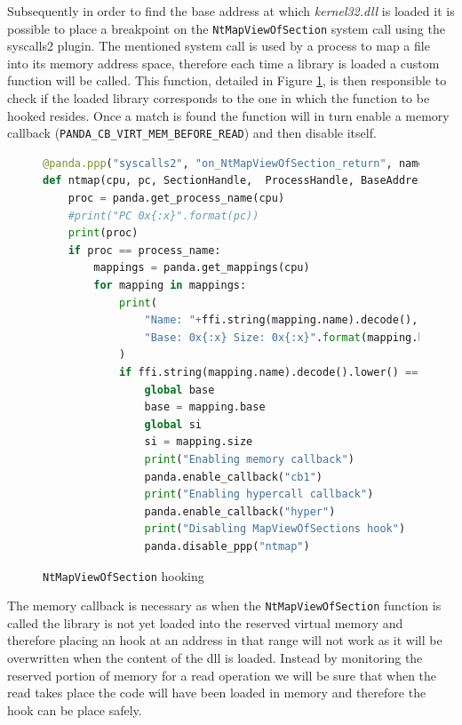 Subsequently in order to find the base address at which \textit{kernel32.dll} is loaded it is possible to place a breakpoint on the \lstinline{NtMapViewOfSection} system call using the syscalls2 plugin. The mentioned system call is used by a process to map a file into its memory address space, therefore each time a library is loaded a custom function will be called. This function, detailed in Figure \ref{fig:ntmap}, is then responsible to check if the loaded library corresponds to the one in which the function to be hooked resides. Once a match is found the function will in turn enable a memory callback (\lstinline{PANDA_CB_VIRT_MEM_BEFORE_READ}) and then disable itself.

\begin{figure}[htp]
\centering
\begin{lstlisting}[language=Python] 
@panda.ppp("syscalls2", "on_NtMapViewOfSection_return", name="ntmap")
def ntmap(cpu, pc, SectionHandle,  ProcessHandle, BaseAddress, ZeroBits, CommitSize, SectionOffset, ViewSize, InheritDisposition, AllocationType, Win32Protect):
    proc = panda.get_process_name(cpu)
    #print("PC 0x{:x}".format(pc))
    print(proc)
    if proc == process_name:
        mappings = panda.get_mappings(cpu)
        for mapping in mappings:
            print(
                "Name: "+ffi.string(mapping.name).decode(),
                "Base: 0x{:x} Size: 0x{:x}".format(mapping.base,mapping.size)
            )
            if ffi.string(mapping.name).decode().lower() == "kernel32.dll":
                global base
                base = mapping.base
                global si
                si = mapping.size
                print("Enabling memory callback")
                panda.enable_callback("cb1")
                print("Enabling hypercall callback")
                panda.enable_callback("hyper")
                print("Disabling MapViewOfSections hook")
                panda.disable_ppp("ntmap")
\end{lstlisting}
\caption{\lstinline{NtMapViewOfSection} hooking}
\label{fig:ntmap}
\end{figure}

The memory callback is necessary as when the \lstinline{NtMapViewOfSection} function is called the library is not yet loaded into the reserved virtual memory and therefore placing an hook at an address in that range will not work as it will be overwritten when the content of the dll is loaded. Instead by monitoring the reserved portion of memory for a read operation we will be sure that when the read takes place the code will have been loaded in memory and therefore the hook can be place safely. 

